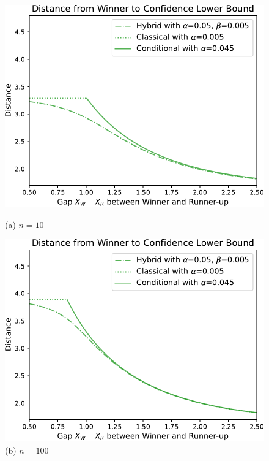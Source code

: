 \documentclass{article}
\begin{document}
\begin{appendix}
\begin{figure}
    \centering
    \hspace{-0.035\textwidth}
    \begin{minipage}{0.32\textwidth}
        \centering
        \includegraphics[width=\textwidth]{fig/hyb_dist_to_winner_n=10.pdf}
        \caption*{(a) $n=10$}
    \end{minipage}
    \hfill
    \hspace{0.01\textwidth}
    \begin{minipage}{0.32\textwidth}
        \centering
        \includegraphics[width=\textwidth]{fig/hyb_dist_to_winner_n=100.pdf}
        \caption*{(b) $n=100$}

\end{minipage}
\end{figure}
\end{appendix}
\end{document}
